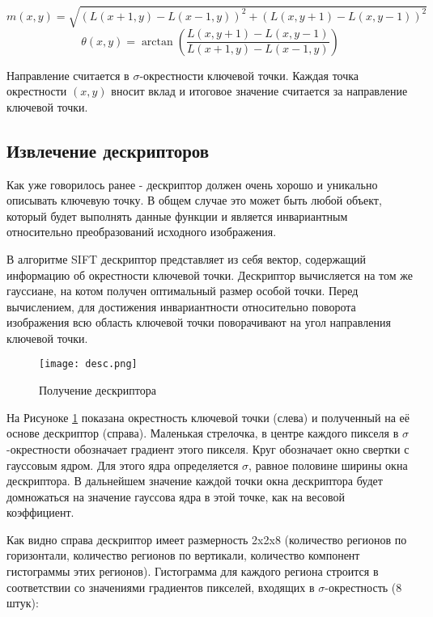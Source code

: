 \begin{equation}
    m(x,y)=\sqrt{(L(x+1,y) - L(x-1,y))^2 + (L(x,y+1) - L(x,y-1))^2}
\end{equation}
\begin{equation}
    \theta(x,y)=\arctan{\left(\frac{L(x,y+1) - L(x,y-1)}{L(x+1,y) - L(x-1,y)}\right)}
\end{equation}

Направление считается в $\sigma$-окрестности ключевой точки.  Каждая точка окрестности $(x, y)$ вносит вклад и итоговое значение считается за направление ключевой точки.

\subsection{Извлечение дескрипторов}

Как уже говорилось ранее - дескриптор должен очень хорошо и уникально описывать ключевую точку. В общем случае это может быть любой объект, который будет выполнять данные функции и является инвариантным относительно преобразований исходного изображения.

В алгоритме SIFT дескриптор представляет из себя вектор, содержащий информацию об окрестности ключевой точки. Дескриптор вычисляется на том же гауссиане, на котом получен оптимальный размер особой точки. Перед вычислением, для достижения инвариантности относительно поворота изображения всю область ключевой точки поворачивают на угол направления ключевой точки.

\begin{figure}[h]
    \centering
    \texttt{[image: desc.png]}
    \caption{Получение дескриптора}
    \label{fig:desc}
\end{figure}

На Рисуноке \ref{fig:desc} показана окрестность ключевой точки (слева) и полученный на её основе дескриптор (справа). Маленькая стрелочка, в центре каждого пикселя в $\sigma$-окрестности обозначает градиент этого пикселя. Круг обозначает окно свертки с гауссовым ядром. Для этого ядра определяется $\sigma$, равное половине ширины окна дескриптора. В дальнейшем значение каждой точки окна дескриптора будет домножаться на значение гауссова ядра в этой точке, как на весовой коэффициент.

Как видно справа дескриптор имеет размерность 2x2x8 (количество регионов по горизонтали, количество регионов по вертикали, количество компонент гистограммы этих регионов). Гистограмма для каждого региона строится в соответствии со значениями градиентов пикселей, входящих в  $\sigma$-окрестность (8 штук):


